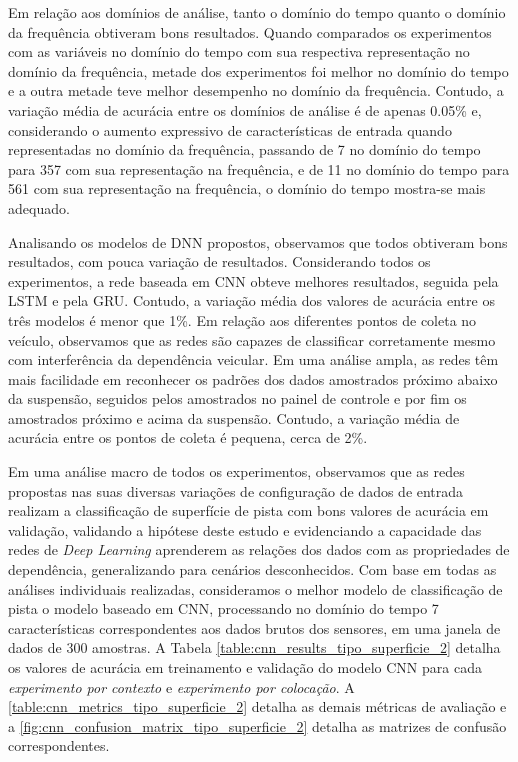 Em relação aos domínios de análise, tanto o domínio do tempo quanto o domínio da frequência obtiveram bons resultados. Quando comparados os experimentos com as variáveis no domínio do tempo com sua respectiva representação no domínio da frequência, metade dos experimentos foi melhor no domínio do tempo e a outra metade teve melhor desempenho no domínio da frequência. Contudo, a variação média de acurácia entre os domínios de análise é de apenas 0.05\% e, considerando o aumento expressivo de características de entrada quando representadas no domínio da frequência, passando de 7 no domínio do tempo para 357 com sua representação na frequência, e de 11 no domínio do tempo para 561 com sua representação na frequência, o domínio do tempo mostra-se mais adequado.

Analisando os modelos de DNN propostos, observamos que todos obtiveram bons resultados, com pouca variação de resultados. Considerando todos os experimentos, a rede baseada em CNN obteve melhores resultados, seguida pela LSTM e pela GRU. Contudo, a variação média dos valores de acurácia entre os três modelos é menor que 1\%. Em relação aos diferentes pontos de coleta no veículo, observamos que as redes são capazes de classificar corretamente mesmo com interferência da dependência veicular. Em uma análise ampla, as redes têm mais facilidade em reconhecer os padrões dos dados amostrados próximo abaixo da suspensão, seguidos pelos amostrados no painel de controle e por fim os amostrados próximo e acima da suspensão. Contudo, a variação média de acurácia entre os pontos de coleta é pequena, cerca de 2\%.

Em uma análise macro de todos os experimentos, observamos que as redes propostas nas suas diversas variações de configuração de dados de entrada realizam a classificação de superfície de pista com bons valores de acurácia em validação, validando a hipótese deste estudo e evidenciando a capacidade das redes de \textit{Deep Learning} aprenderem as relações dos dados com as propriedades de dependência, generalizando para cenários desconhecidos. Com base em todas as análises individuais realizadas, consideramos o melhor modelo de classificação de pista o modelo baseado em CNN, processando no domínio do tempo 7 características correspondentes aos dados brutos dos sensores, em uma janela de dados de 300 amostras. A Tabela \ref{table:cnn_results_tipo_superficie_2} detalha os valores de acurácia em treinamento e validação do modelo CNN para cada \emph{experimento por contexto} e \emph{experimento por colocação}. A \autoref{table:cnn_metrics_tipo_superficie_2} detalha as demais métricas de avaliação e a \autoref{fig:cnn_confusion_matrix_tipo_superficie_2} detalha as matrizes de confusão correspondentes.

